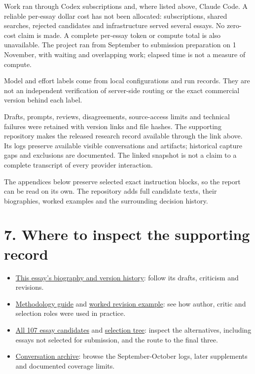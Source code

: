 Work ran through Codex subscriptions and, where listed above, Claude Code. A reliable per-essay dollar cost has not been allocated: subscriptions, shared searches, rejected candidates and infrastructure served several essays. No zero-cost claim is made. A complete per-essay token or compute total is also unavailable. The project ran from September to submission preparation on 1 November, with waiting and overlapping work; elapsed time is not a measure of compute.

Model and effort labels come from local configurations and run records. They are not an independent verification of server-side routing or the exact commercial version behind each label.

Drafts, prompts, reviews, disagreements, source-access limits and technical failures were retained with version links and file hashes. The supporting repository makes the released research record available through the link above. Its logs preserve available visible conversations and artifacts; historical capture gaps and exclusions are documented. The linked snapshot is not a claim to a complete transcript of every provider interaction.

The appendices below preserve selected exact instruction blocks, so the report can be read on its own. The repository adds full candidate texts, their biographies, worked examples and the surrounding decision history.

\section*{7. Where to inspect the supporting record}

\begin{itemize}
\item \href{https://anonymous.4open.science/r/philosophy-lab-public-D1C2/essays/E012/README.md}{This essay's biography and version history}: follow its drafts, criticism and revisions.
\item \href{https://anonymous.4open.science/r/philosophy-lab-public-D1C2/docs/method.md}{Methodology guide} and \href{https://anonymous.4open.science/r/philosophy-lab-public-D1C2/docs/worked-example.md}{worked revision example}: see how author, critic and selection roles were used in practice.
\item \href{https://anonymous.4open.science/r/philosophy-lab-public-D1C2/essays/topics.md}{All 107 essay candidates} and \href{https://anonymous.4open.science/r/philosophy-lab-public-D1C2/docs/selection-tree.md}{selection tree}: inspect the alternatives, including essays not selected for submission, and the route to the final three.
\item \href{https://anonymous.4open.science/r/philosophy-lab-public-D1C2/logs/README.md}{Conversation archive}: browse the September-October logs, later supplements and documented coverage limits.
\end{itemize}

